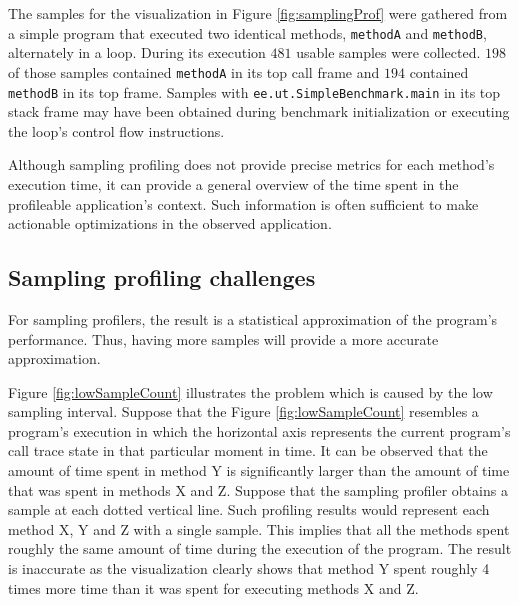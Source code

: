 \documentclass[..thesis.tex]{subfiles}
\begin{document}
The samples for the visualization in Figure \ref{fig:samplingProf} were gathered from a simple program that executed two identical methods, \texttt{methodA} and \texttt{methodB}, alternately in a loop. During its execution $481$ usable samples were collected. $198$ of those samples contained \texttt{methodA} in its top call frame and $194$ contained \texttt{methodB} in its top frame. Samples with \texttt{ee.ut.SimpleBenchmark.main} in its top stack frame may have been obtained during benchmark initialization or executing the loop's control flow instructions.

Although sampling profiling does not provide precise metrics for each method's execution time, it can provide a general overview of the time spent in the profileable application's context. Such information is often sufficient to make actionable optimizations in the observed application.

\subsection{Sampling profiling challenges}

For sampling profilers, the result is a statistical approximation of the program's performance. Thus, having more samples will provide a more accurate approximation. 

Figure \ref{fig:lowSampleCount} illustrates the problem which is caused by the low sampling interval. Suppose that the Figure \ref{fig:lowSampleCount} resembles a program's execution in which the horizontal axis represents the current program's call trace state in that particular moment in time. It can be observed that the amount of time spent in method Y is significantly larger than the amount of time that was spent in methods X and Z. Suppose that the sampling profiler obtains a sample at each dotted vertical line. Such profiling results would represent each method X, Y and Z with a single sample. This implies that all the methods spent roughly the same amount of time during the execution of the program. The result is inaccurate as the visualization clearly shows that method Y spent roughly 4 times more time than it was spent for executing methods X and Z.
\end{document}
